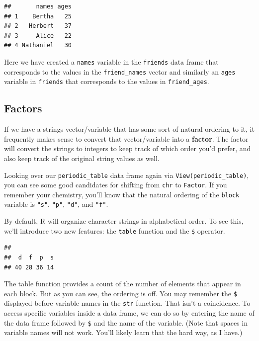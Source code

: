 \documentclass[]{tufte-book}
\newenvironment{Shaded}{\begin{snugshade}}{\end{snugshade}}
\newcommand{\FunctionTok}[1]{\textcolor[rgb]{0.13,0.29,0.53}{\textbf{#1}}}
\newcommand{\NormalTok}[1]{#1}
\newcommand{\SpecialCharTok}[1]{\textcolor[rgb]{0.81,0.36,0.00}{\textbf{#1}}}
\begin{document}
\begin{verbatim}
##       names ages
## 1    Bertha   25
## 2   Herbert   37
## 3     Alice   22
## 4 Nathaniel   30
\end{verbatim}

Here we have created a \texttt{names} variable in the \texttt{friends} data frame that corresponds to the values in the \texttt{friend\_names} vector and similarly an \texttt{ages} variable in \texttt{friends} that corresponds to the values in \texttt{friend\_ages}.

\subsection{Factors}\label{factors}

If we have a strings vector/variable that has some sort of natural ordering to it, it frequently makes sense to convert that vector/variable into a \textbf{factor}. The factor will convert the strings to integers to keep track of which order you'd prefer, and also keep track of the original string values as well.

Looking over our \texttt{periodic\_table} data frame again via \texttt{View(periodic\_table)}, you can see some good candidates for shifting from \texttt{chr} to \texttt{Factor}. If you remember your chemistry, you'll know that the natural ordering of the \texttt{block} variable is \texttt{"s"}, \texttt{"p"}, \texttt{"d"}, and \texttt{"f"}.

By default, R will organize character strings in alphabetical order. To see this, we'll introduce two new features: the \texttt{table} function and the \texttt{\$} operator.

\begin{Shaded}
\end{Shaded}

\begin{verbatim}
## 
##  d  f  p  s 
## 40 28 36 14
\end{verbatim}

The table function provides a count of the number of elements that appear in each block. But as you can see, the ordering is off. You may remember the \texttt{\$} displayed before variable names in the \texttt{str} function. That isn't a coincidence. To access specific variables inside a data frame, we can do so by entering the name of the data frame followed by \texttt{\$} and the name of the variable. (Note that spaces in variable names will not work. You'll likely learn that the hard way, as I have.)
\end{document}
